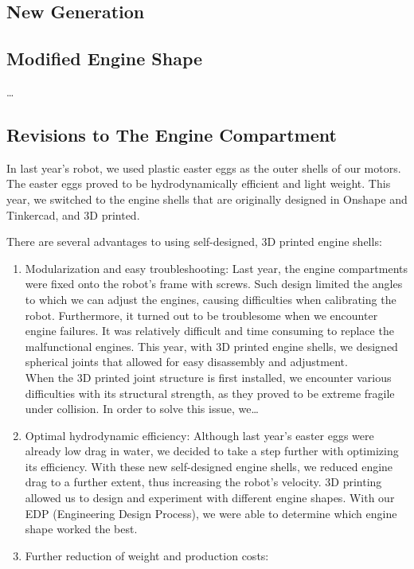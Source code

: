 \documentclass[11pt, oneside]{article}   	%
\begin{document}
\subsection{New Generation}
\subsection*{Modified Engine Shape}
\dots
\subsection*{Revisions to The Engine Compartment}
In last year’s robot, we used plastic easter eggs as the outer shells of our motors. The easter eggs proved to be hydrodynamically efficient and light weight. This year, we switched to the engine shells that are originally designed in Onshape and Tinkercad, and 3D printed.
\begin{center}
	There are several advantages to using self-designed, 3D printed engine shells:
\end{center}
\begin{enumerate}
	\item Modularization and easy troubleshooting: Last year, the engine compartments were fixed onto the robot’s frame with screws. Such design limited the angles to which we can adjust the engines, causing difficulties when calibrating the robot. Furthermore, it turned out to be troublesome when we encounter engine failures. It was relatively difficult and time consuming to replace the malfunctional engines. This year, with 3D printed engine shells, we designed spherical joints that allowed for easy disassembly and adjustment.
	\\When the 3D printed joint structure is first installed, we encounter various difficulties with its structural strength, as they proved to be extreme fragile under collision. In order to solve this issue, we…

	\item Optimal hydrodynamic efficiency: Although last year’s easter eggs were already low drag in water, we decided to take a step further with optimizing its efficiency. With these new self-designed engine shells, we reduced engine drag to a further extent, thus increasing the robot’s velocity. 3D printing allowed us to design and experiment with different engine shapes. With our EDP (Engineering Design Process), we were able to determine which engine shape worked the best.

	\item Further reduction of weight and production costs:

\end{enumerate}
\end{document}
